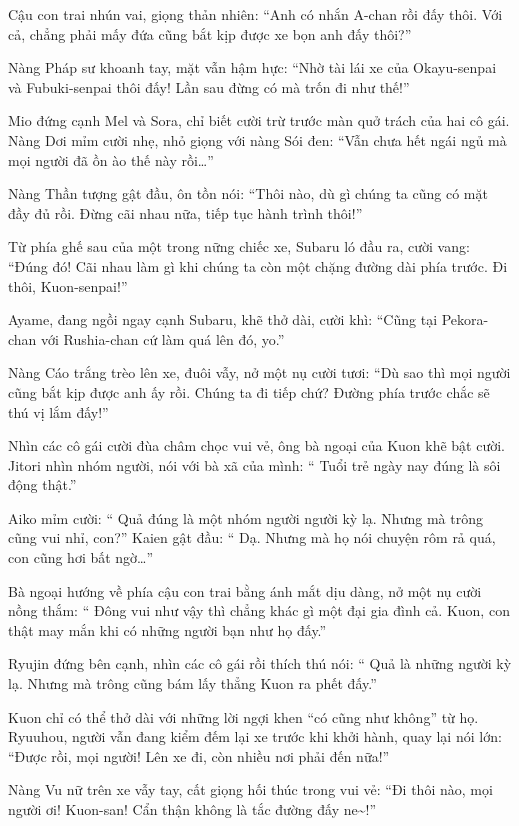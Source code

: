 \documentclass[../main.tex]{subfiles}
\begin{document}
Cậu con trai nhún vai, giọng thản nhiên: ``Anh có nhắn A-chan rồi đấy thôi. Với cả, chẳng phải mấy đứa cũng bắt kịp được xe bọn anh đấy thôi?''

Nàng Pháp sư khoanh tay, mặt vẫn hậm hực: ``Nhờ tài lái xe của Okayu-senpai và Fubuki-senpai thôi đấy! Lần sau đừng có mà trốn đi như thế!''

Mio đứng cạnh Mel và Sora, chỉ biết cười trừ trước màn quở trách của hai cô gái. Nàng Dơi mỉm cười nhẹ, nhỏ giọng với nàng Sói đen: ``Vẫn chưa hết ngái ngủ mà mọi người đã ồn ào thế này rồi\dots''

Nàng Thần tượng gật đầu, ôn tồn nói: ``Thôi nào, dù gì chúng ta cũng có mặt đầy đủ rồi. Đừng cãi nhau nữa, tiếp tục hành trình thôi!''

Từ phía ghế sau của một trong nững chiếc xe, Subaru ló đầu ra, cười vang: ``Đúng đó! Cãi nhau làm gì khi chúng ta còn một chặng đường dài phía trước. Đi thôi, Kuon-senpai!''

Ayame, đang ngồi ngay cạnh Subaru, khẽ thở dài, cười khì: ``Cũng tại Pekora-chan với Rushia-chan cứ làm quá lên đó, yo.''

Nàng Cáo trắng trèo lên xe, đuôi vẫy, nở một nụ cười tươi: ``Dù sao thì mọi người cũng bắt kịp được anh ấy rồi. Chúng ta đi tiếp chứ? Đường phía trước chắc sẽ thú vị lắm đấy!''

Nhìn các cô gái cười đùa châm chọc vui vẻ, ông bà ngoại của Kuon khẽ bật cười. Jitori nhìn nhóm người, nói với bà xã của mình: ``{\color{red} Tuổi trẻ ngày nay đúng là sôi động thật.}''

Aiko mỉm cười: ``{\color{red} Quả đúng là một nhóm người người kỳ lạ. Nhưng mà trông cũng vui nhỉ, con?}'' Kaien gật đầu: ``{\color{red} Dạ. Nhưng mà họ nói chuyện rôm rả quá, con cũng hơi bất ngờ\dots}''

Bà ngoại hướng về phía cậu con trai bằng ánh mắt dịu dàng, nở một nụ cười nồng thắm: ``{\color{red} Đông vui như vậy thì chẳng khác gì một đại gia đình cả. Kuon, con thật may mắn khi có những người bạn như họ đấy.}''

Ryujin đứng bên cạnh, nhìn các cô gái rồi thích thú nói: ``{\color{red} Quả là những người kỳ lạ. Nhưng mà trông cũng bám lấy thẳng Kuon ra phết đấy.}''

Kuon chỉ có thể thở dài với những lời ngợi khen ``có cũng như không'' từ họ. Ryuuhou, người vẫn đang kiểm đếm lại xe trước khi khởi hành, quay lại nói lớn: ``Được rồi, mọi người! Lên xe đi, còn nhiều nơi phải đến nữa!''

Nàng Vu nữ trên xe vẫy tay, cất giọng hối thúc trong vui vẻ: ``Đi thôi nào, mọi người ơi! Kuon-san! Cẩn thận không là tắc đường đấy ne\~{}!''
\end{document}

